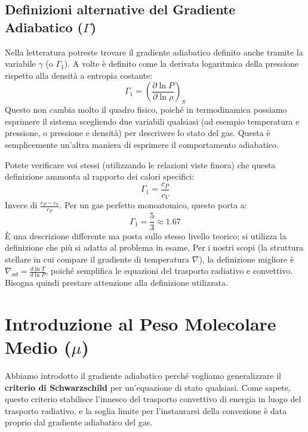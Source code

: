 \subsection{Definizioni alternative del Gradiente Adiabatico ($\Gamma$)}
Nella letteratura potreste trovare il gradiente adiabatico definito anche tramite la variabile $\gamma$ (o $\Gamma_1$). A volte è definito come la derivata logaritmica della pressione rispetto alla densità a entropia costante:
\begin{equation}
\Gamma_1 = \left( \frac{\partial \ln P}{\partial \ln \rho} \right)_S
\end{equation}
Questo non cambia molto il quadro fisico, poiché in termodinamica possiamo esprimere il sistema scegliendo due variabili qualsiasi (ad esempio temperatura e pressione, o pressione e densità) per descrivere lo stato del gas. Questa è semplicemente un'altra maniera di esprimere il comportamento adiabatico.

Potete verificare voi stessi (utilizzando le relazioni viste finora) che questa definizione ammonta al rapporto dei calori specifici:
\begin{equation}
\Gamma_1 = \frac{c_P}{c_V}
\end{equation}
Invece di $\frac{c_P - c_V}{c_P}$. Per un gas perfetto monoatomico, questo porta a:
\begin{equation}
\Gamma_1 = \frac{5}{3} \approx 1.67
\end{equation}
È una descrizione differente ma posta sullo stesso livello teorico; si utilizza la definizione che più si adatta al problema in esame. Per i nostri scopi (la struttura stellare in cui compare il gradiente di temperatura $\nabla$), la definizione migliore è $\nabla_{ad} = \frac{d\ln T}{d\ln P}$, poiché semplifica le equazioni del trasporto radiativo e convettivo. Bisogna quindi prestare attenzione alla definizione utilizzata.

\section{Introduzione al Peso Molecolare Medio ($\mu$)}

Abbiamo introdotto il gradiente adiabatico perché vogliamo generalizzare il \textbf{criterio di Schwarzschild} per un'equazione di stato qualsiasi. Come sapete, questo criterio stabilisce l'innesco del trasporto convettivo di energia in luogo del trasporto radiativo, e la soglia limite per l'instaurarsi della convezione è data proprio dal gradiente adiabatico del gas.

